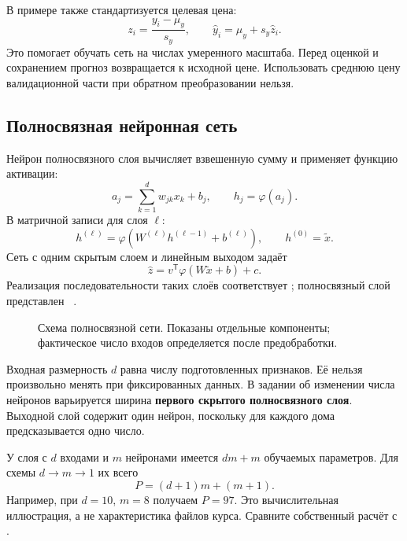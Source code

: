 В примере также стандартизуется целевая цена:
\begin{equation}\label{eq:target}
z_i=\frac{y_i-\mu_y}{s_y},\qquad
\widehat y_i=\mu_y+s_y\widehat z_i.
\end{equation}
Это помогает обучать сеть на числах умеренного масштаба.
Перед оценкой и сохранением прогноз возвращается к исходной цене.
Использовать среднюю цену валидационной части при обратном преобразовании
нельзя.

\subsection{Полносвязная нейронная сеть}
Нейрон полносвязного слоя вычисляет взвешенную сумму и применяет
функцию активации:
\begin{equation}
a_j=\sum_{k=1}^{d}w_{jk}x_k+b_j,\qquad h_j=\varphi(a_j).
\end{equation}
В матричной записи для слоя \(\ell\):
\begin{equation}
h^{(\ell)}=\varphi\!\left(W^{(\ell)}h^{(\ell-1)}+b^{(\ell)}\right),
\qquad h^{(0)}=\widetilde x.
\end{equation}
Сеть с одним скрытым слоем и линейным выходом задаёт
\begin{equation}
\widehat z=v^{\mathsf T}\varphi(W\widetilde x+b)+c.
\end{equation}
Реализация последовательности таких слоёв соответствует
; полносвязный слой представлен
~\cite{sequential,dense}.

\begin{figure}[htbp]
\centering
\caption{Схема полносвязной сети. Показаны отдельные компоненты;
фактическое число входов определяется после предобработки.}
\label{fig:network}
\end{figure}

Входная размерность \(d\) равна числу подготовленных признаков.
Её нельзя произвольно менять при фиксированных данных.
В задании об изменении числа нейронов варьируется ширина
\textbf{первого скрытого полносвязного слоя}. Выходной слой содержит
один нейрон, поскольку для каждого дома предсказывается одно число.

У слоя с \(d\) входами и \(m\) нейронами имеется \(dm+m\)
обучаемых параметров. Для схемы \(d\to m\to1\) их всего
\begin{equation}
P=(d+1)m+(m+1).
\end{equation}
Например, при \(d=10\), \(m=8\) получаем \(P=97\).
Это вычислительная иллюстрация, а не характеристика файлов курса.
Сравните собственный расчёт с .

